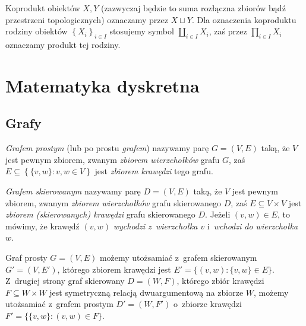 Koprodukt obiektów $X, Y$ (zazwyczaj będzie to suma rozłączna zbiorów bądź przestrzeni topologicznych) oznaczamy przez $X\sqcup Y$. Dla oznaczenia koproduktu rodziny obiektów $\left\{X_i\right\}_{i\in I}$ stosujemy symbol $\coprod_{i\in I}X_i$, zaś przez $\prod_{i\in I}X_i$ oznaczamy produkt tej rodziny.







\section{Matematyka dyskretna}
\subsection{Grafy}
\textit{Grafem prostym} (lub po prostu \textit{grafem}) nazywamy parę $G=(V,E)$ taką, że $V$ jest pewnym zbiorem, zwanym \textit{zbiorem wierzchołków} grafu $G$, zaś $E\subseteq\left\{\{v,w\}:v,w\in V\right\}$ jest \textit{zbiorem krawędzi} tego grafu. 

\textit{Grafem skierowanym} nazywamy parę $D=(V,E)$ taką, że $V$ jest pewnym zbiorem, zwanym \textit{zbiorem wierzchołków} grafu skierowanego $D$, zaś $E\subseteq V\times V$ jest \textit{zbiorem (skierowanych) krawędzi} grafu skierowanego $D$. Jeżeli $(v,w)\in E$, to mówimy, że krawędź $(v,w)$ \textit{wychodzi z~wierzchołka $v$} i~\textit{wchodzi do wierzchołka $w$}.

\begin{uw}\label{uw-o-utozsamieniu}
Graf prosty $G=(V,E)$ możemy utożsamiać z~grafem skierowanym $G'=(V,E')$, którego zbiorem krawędzi jest $E'=\{(v,w):\{v,w\}\in E\}$. Z~drugiej strony graf skierowany $D=(W,F)$, którego zbiór krawędzi $F\subseteq W\times W$ jest symetryczną relacją dwuargumentową na zbiorze $W$, możemy utożsamiać z~grafem prostym $D'=(W,F')$ o~zbiorze krawędzi $F'=\{\{v,w\}:(v,w)\in F\}$.
\end{uw}


